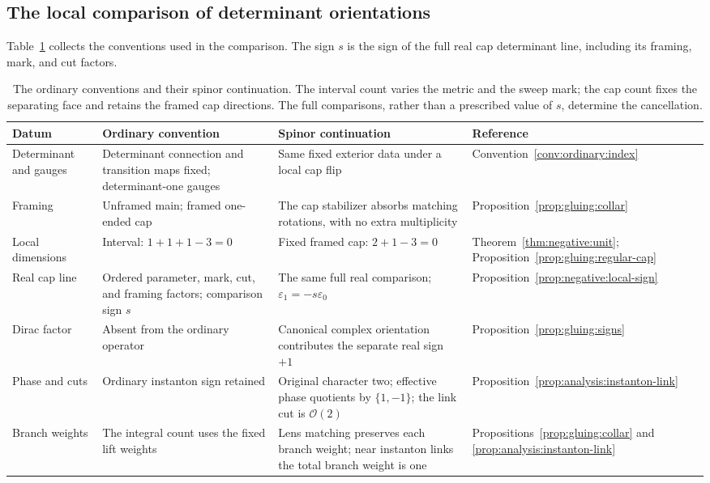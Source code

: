\subsection{The local comparison of determinant orientations}

Table~\ref{tab:gluing:orientations} collects the conventions used in the
comparison.  The sign $s$ is the sign of the full real cap determinant
line, including its framing, mark, and cut factors.
\begin{table}[htbp]
\centering
\footnotesize
\begin{tabular}{@{}>{\raggedright\arraybackslash}p{}>{\raggedright\arraybackslash}p{}>{\raggedright\arraybackslash}p{}>{\raggedright\arraybackslash}p{}@{}}
\toprule
Datum & Ordinary convention & Spinor continuation & Reference \\
\midrule
Determinant and gauges & Determinant connection and transition maps fixed;
determinant-one gauges & Same fixed exterior data under a local cap
flip & Convention~\ref{conv:ordinary:index} \\
Framing & Unframed main; framed one-ended cap & The cap stabilizer
absorbs matching rotations, with no extra multiplicity &
Proposition~\ref{prop:gluing:collar} \\
Local dimensions & Interval: $1+1+1-3=0$ & Fixed framed cap:
$2+1-3=0$ & Theorem~\ref{thm:negative:unit};
Proposition~\ref{prop:gluing:regular-cap} \\
Real cap line & Ordered parameter, mark, cut, and framing factors;
comparison sign $s$ & The same full real comparison;
$\varepsilon_1=-s\varepsilon_0$ &
Proposition~\ref{prop:negative:local-sign} \\
Dirac factor & Absent from the ordinary operator & Canonical complex
orientation contributes the separate real sign $+1$ &
Proposition~\ref{prop:gluing:signs} \\
Phase and cuts & Ordinary instanton sign retained & Original character
two; effective phase quotients by $\{1,-1\}$; the link cut is
$\mathcal O(2)$ & Proposition~\ref{prop:analysis:instanton-link} \\
Branch weights & The integral count uses the fixed lift weights &
Lens matching preserves each branch weight; near instanton links the
total branch weight is one &
Propositions~\ref{prop:gluing:collar} and
\ref{prop:analysis:instanton-link} \\
\bottomrule
\end{tabular}
\caption{The ordinary conventions and their spinor continuation.
The interval count varies the metric and the sweep mark; the cap count
fixes the separating face and retains the framed cap directions.
The full comparisons, rather than a prescribed value of $s$, determine
the cancellation.}
\label{tab:gluing:orientations}
\end{table}

